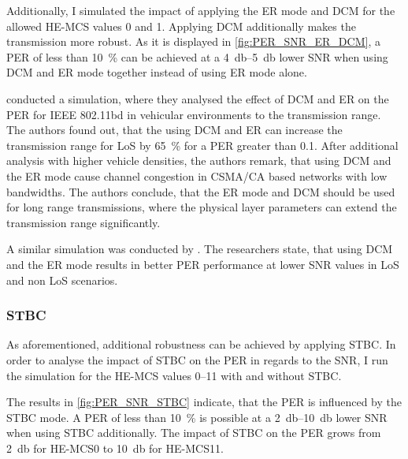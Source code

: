 Additionally, I simulated the impact of applying the \ac{ER} mode and \ac{DCM} for the allowed HE-MCS values \num{0} and \num{1}.
Applying \ac{DCM} additionally makes the transmission more robust. As it is displayed in \autoref{fig:PER_SNR_ER_DCM},
a \ac{PER} of less than \SI{10}{\percent} can be achieved at a \SIrange{4}{5}{\decibel} lower \ac{SNR} when using \ac{DCM} and \ac{ER} mode together instead
of using \ac{ER} mode alone.

\textcite{jacob_system-level_2020} conducted a simulation, where they analysed the effect of \ac{DCM} and \ac{ER} on the \ac{PER} for
IEEE 802.11bd in vehicular environments to the transmission range. The authors found out, that the using \ac{DCM} and \ac{ER} can
increase the transmission range for \ac{LoS} by \SI{65}{\percent} for a \ac{PER} greater than \num{0.1}. After additional analysis with higher
vehicle densities, the authors remark, that using \ac{DCM} and the \ac{ER} mode cause channel congestion in CSMA/CA based
networks with low bandwidths. The authors conclude, that the \ac{ER} mode and \ac{DCM} should be used for long range transmissions, where
the physical layer parameters can extend the transmission range significantly.

A similar simulation was conducted by \textcite{triwinarko_phy_2021}. The researchers state, that using \ac{DCM} and the
\ac{ER} mode results in better \ac{PER} performance at lower \ac{SNR} values in \ac{LoS} and non \ac{LoS} scenarios.

\subsubsection*{\acf{STBC}}
As aforementioned, additional robustness can be achieved by applying \ac{STBC}. In order to analyse the impact of \ac{STBC} on the \ac{PER} in regards to the \ac{SNR},
I run the simulation for the HE-MCS values \numrange{0}{11} with and without \ac{STBC}.

The results in \autoref{fig:PER_SNR_STBC} indicate, that the \ac{PER} is influenced
by the \ac{STBC} mode. A \ac{PER} of less than \SI{10}{\percent} is possible at a \SIrange{2}{10}{\decibel} lower \ac{SNR} when using \ac{STBC} additionally.
The impact of \ac{STBC} on the \ac{PER} grows from \SI{2}{\decibel} for HE-MCS\num{0} to \SI{10}{\decibel} for HE-MCS\num{11}.

